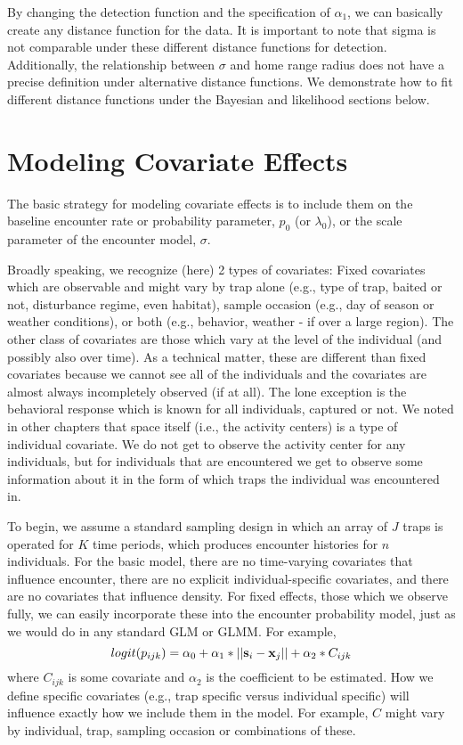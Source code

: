 By changing the detection function and the specification of
$\alpha_1$, we can basically create any distance function for the
data.  It is important to note that sigma is not comparable under
these different distance functions for detection.  Additionally, the
relationship between $\sigma$ and home range radius does not have
a precise definition under alternative distance functions.  We
demonstrate how to fit different distance functions under the Bayesian
and likelihood sections below.


\section{Modeling Covariate Effects}


The basic strategy  for modeling covariate effects is to include them
on the baseline encounter rate or probability parameter, $p_{0}$ (or
$\lambda_{0}$), or the scale parameter of the encounter model, 
$\sigma$.

Broadly speaking, we recognize (here) 2 types of covariates: Fixed
covariates which are observable and might vary by trap alone (e.g.,
type of trap, baited or not, disturbance regime, even habitat), sample
occasion (e.g., day of season or weather conditions), or both (e.g.,
behavior, weather - if over a large region).  The other class of
covariates are those which vary at the level of the individual (and
possibly also over time).  As a technical matter, these are different
than fixed covariates because we cannot see all of the individuals and
the covariates are almost always incompletely observed (if at all).
The lone exception is the behavioral response which is known for all
individuals, captured or not.  We noted in other chapters that space
itself (i.e., the activity centers) is a type of individual
covariate. We do not get to observe the activity center for any
individuals, but for individuals that are encountered we get to
observe some information about it in the form of which traps the
individual was encountered in.


To begin, we assume a standard sampling design in which an
array of $J$ traps is operated for $K$ time periods, which produces
encounter histories for $n$ individuals.  For the basic model, there
are no time-varying covariates that influence encounter, there are no
explicit individual-specific covariates, and there are no covariates
that influence density.  For fixed effects, those which we observe
fully, we can easily incorporate these into the encounter probability
model, just as we would do in any standard GLM or GLMM. For example,
\[
logit(p_{ijk}) = \alpha_0 + \alpha_1*||{\bf s}_{i}-{\bf x}_{j}|| +
\alpha_2*C_{ijk}
\]
where $C_{ijk}$ is some covariate and
$\alpha_2$ is the coefficient to be estimated. 
 How we define specific covariates (e.g., trap specific
versus individual specific) will influence exactly how we include them
in the model.  For example, $C$ might vary by 
individual, trap, sampling occasion or combinations of these. 


